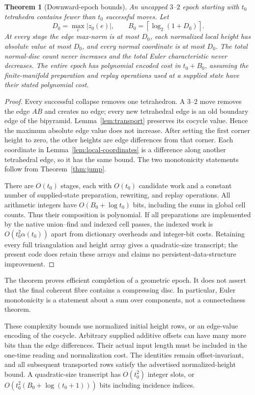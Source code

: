 \documentclass[11pt,letterpaper]{article}
\newtheorem{theorem}{Theorem}[section]
\theoremstyle{definition}
\theoremstyle{remark}
\begin{document}
\begin{theorem}[Downward-epoch bounds]
\label{thm:epoch}
An uncapped $3$--$2$ epoch starting with $t_0$ tetrahedra contains fewer
than $t_0$ successful moves. Let
\[
 D_0=\max_e|z_0(e)|,\qquad
 B_0=\left\lceil\log_2(1+D_0)\right\rceil.
\]
At every stage the edge max-norm is at most $D_0$, each normalized local
height has absolute value at most $D_0$, and every normal coordinate is at
most $D_0$. The total normal-disc count never increases and the total Euler
characteristic never decreases. The entire epoch has polynomial encoded
cost in $t_0+B_0$, assuming the finite-manifold preparation and replay
operations used at a supplied state have their stated polynomial cost.
\end{theorem}
\begin{proof}
Every successful collapse removes one tetrahedron. A $3$--$2$ move removes
the edge $AB$ and creates no edge; every new tetrahedral edge is an old
boundary edge of the bipyramid. Lemma~\ref{lem:transport} preserves its
cocycle value. Hence the maximum absolute edge value does not increase.
After setting the first corner height to zero, the other heights are edge
differences from that corner. Each coordinate in
Lemma~\ref{lem:local-coordinates} is a difference along another tetrahedral
edge, so it has the same bound. The two monotonicity statements follow
from Theorem~\ref{thm:jump}.

There are $O(t_0)$ stages, each with $O(t_0)$ candidate work and a
constant number of supplied-state preparation, rewriting, and replay
operations. All arithmetic integers have $O(B_0+\log t_0)$ bits, including
the sums in global cell counts. Thus their composition is polynomial.
If all preparations are implemented by the native union--find and indexed
cell passes, the indexed work is $O(t_0^2\alpha(t_0))$ apart from dictionary
overheads and integer-bit costs. Retaining every full triangulation and
height array gives a quadratic-size transcript; the present code does retain
these arrays and claims no persistent-data-structure improvement.
\end{proof}

The theorem proves efficient completion of a geometric epoch. It does not
assert that the final coherent fibre contains a compressing disc. In
particular, Euler monotonicity is a statement about a sum over components,
not a connectedness theorem.

These complexity bounds use normalized initial height rows, or an edge-value
encoding of the cocycle. Arbitrary supplied additive offsets can have many
more bits than the edge differences. Their actual input length must be
included in the one-time reading and normalization cost. The identities
remain offset-invariant, and all subsequent transported rows satisfy the
advertised normalized-height bound. A quadratic-size transcript has
$O(t_0^2)$ integer slots, or
$O(t_0^2(B_0+\log(t_0+1)))$ bits including incidence indices.
\end{document}
